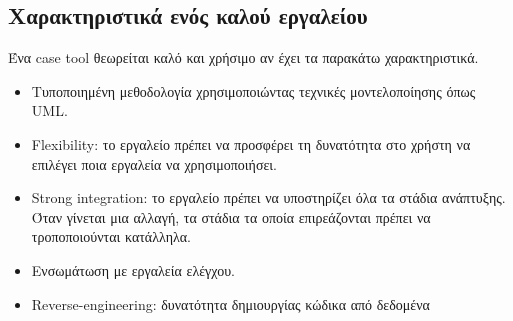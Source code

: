 \subsection{Χαρακτηριστικά ενός καλού εργαλείου}
Ένα case tool θεωρείται καλό και χρήσιμο αν έχει τα παρακάτω χαρακτηριστικά.
\begin{itemize}
	\item Τυποποιημένη μεθοδολογία χρησιμοποιώντας τεχνικές μοντελοποίησης όπως UML.
	\item Flexibility: το εργαλείο πρέπει να προσφέρει τη δυνατότητα στο χρήστη να επιλέγει ποια εργαλεία να χρησιμοποιήσει.
	\item Strong integration: το εργαλείο πρέπει να υποστηρίζει όλα τα στάδια ανάπτυξης. Όταν γίνεται μια αλλαγή, τα στάδια τα οποία επιρεάζονται πρέπει να τροποποιούνται κατάλληλα.
	\item Ενσωμάτωση με εργαλεία ελέγχου.
	\item Reverse-engineering: δυνατότητα δημιουργίας κώδικα από δεδομένα
\end{itemize}

	
